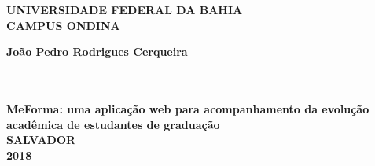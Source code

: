 \vfill
 \begin{center}
    

    {\large\bfseries UNIVERSIDADE FEDERAL DA BAHIA} \\
    
   
    {\large\bfseries CAMPUS ONDINA}  \\ 

    \vspace*{1in}
    \begin{large} \bfseries João Pedro Rodrigues Cerqueira \end{large}\\[0.4in]

    \vspace*{4cm}
    \noindent \\
    
    \large\bfseries{MeForma: uma aplicação web para acompanhamento da evolução acadêmica de estudantes de graduação} \\
    \vfill
    \large\bfseries{ SALVADOR \\ 2018}
\end{center}

\normalsize
